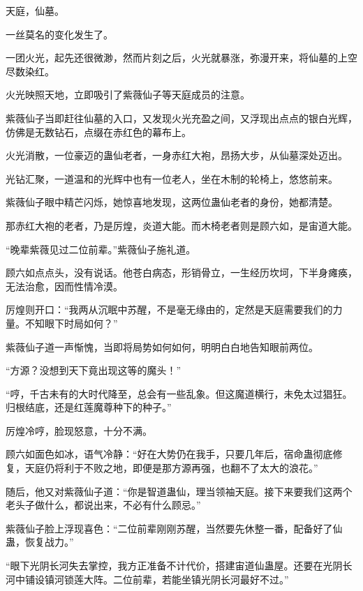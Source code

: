 
\begin{this_body}



天庭，仙墓。

一丝莫名的变化发生了。

一团火光，起先还很微渺，然而片刻之后，火光就暴涨，弥漫开来，将仙墓的上空尽数染红。

火光映照天地，立即吸引了紫薇仙子等天庭成员的注意。

紫薇仙子当即赶往仙墓的入口，又发现火光充盈之间，又浮现出点点的银白光辉，仿佛是无数钻石，点缀在赤红色的幕布上。

火光消散，一位豪迈的蛊仙老者，一身赤红大袍，昂扬大步，从仙墓深处迈出。

光钻汇聚，一道温和的光辉中也有一位老人，坐在木制的轮椅上，悠悠前来。

紫薇仙子眼中精芒闪烁，她惊喜地发现，这两位蛊仙老者的身份，她都清楚。

那赤红大袍的老者，乃是厉煌，炎道大能。而木椅老者则是顾六如，是宙道大能。

“晚辈紫薇见过二位前辈。”紫薇仙子施礼道。

顾六如点点头，没有说话。他苍白病态，形销骨立，一生经历坎坷，下半身瘫痪，无法治愈，因而性情冷漠。

厉煌则开口：“我两从沉眠中苏醒，不是毫无缘由的，定然是天庭需要我们的力量。不知眼下时局如何？”

紫薇仙子道一声惭愧，当即将局势如何如何，明明白白地告知眼前两位。

“方源？没想到天下竟出现这等的魔头！”

“哼，千古未有的大时代降至，总会有一些乱象。但这魔道横行，未免太过猖狂。归根结底，还是红莲魔尊种下的种子。”

厉煌冷哼，脸现怒意，十分不满。

顾六如面色如冰，语气冷静：“好在大势仍在我手，只要几年后，宿命蛊彻底修复，天庭仍将利于不败之地，即便是那方源再强，也翻不了太大的浪花。”

随后，他又对紫薇仙子道：“你是智道蛊仙，理当领袖天庭。接下来要我们这两个老头子做什么，都说出来，不必有什么顾忌。”

紫薇仙子脸上浮现喜色：“二位前辈刚刚苏醒，当然要先休整一番，配备好了仙蛊，恢复战力。”

“眼下光阴长河失去掌控，我方正准备不计代价，搭建宙道仙蛊屋。还要在光阴长河中铺设镇河锁莲大阵。二位前辈，若能坐镇光阴长河最好不过。”


\end{this_body}
